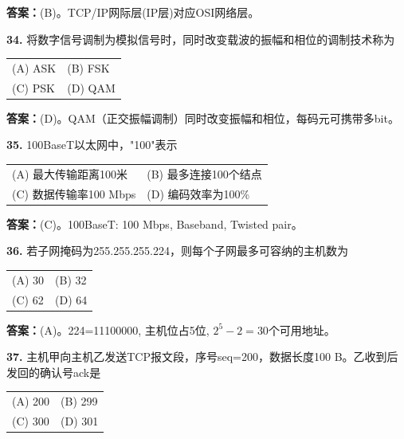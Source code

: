 \ifshowsolutions\par\noindent\textbf{答案：}(B)。TCP/IP网际层(IP层)对应OSI网络层。\else \answerarea \fi

\vspace{6pt}

\noindent\textbf{34.} 将数字信号调制为模拟信号时，同时改变载波的振幅和相位的调制技术称为
\begin{center}
\begin{tabular}{ll}
(A) ASK & (B) FSK \\[6pt]
(C) PSK & (D) QAM
\end{tabular}
\end{center}

\ifshowsolutions\par\noindent\textbf{答案：}(D)。QAM（正交振幅调制）同时改变振幅和相位，每码元可携带多bit。\else \answerarea \fi

\vspace{6pt}

\noindent\textbf{35.} 100BaseT以太网中，"100"表示
\begin{center}
\begin{tabular}{ll}
(A) 最大传输距离100米 & (B) 最多连接100个结点 \\[6pt]
(C) 数据传输率100 Mbps & (D) 编码效率为100\%
\end{tabular}
\end{center}

\ifshowsolutions\par\noindent\textbf{答案：}(C)。100BaseT: 100 Mbps, Baseband, Twisted pair。\else \answerarea \fi

\vspace{6pt}

\noindent\textbf{36.} 若子网掩码为255.255.255.224，则每个子网最多可容纳的主机数为
\begin{center}
\begin{tabular}{ll}
(A) 30 & (B) 32 \\[6pt]
(C) 62 & (D) 64
\end{tabular}
\end{center}

\ifshowsolutions\par\noindent\textbf{答案：}(A)。224=11100000, 主机位占5位, $2^5-2=30$个可用地址。\else \answerarea \fi

\vspace{6pt}

\noindent\textbf{37.} 主机甲向主机乙发送TCP报文段，序号seq=200，数据长度100 B。乙收到后发回的确认号ack是
\begin{center}
\begin{tabular}{ll}
(A) 200 & (B) 299 \\[6pt]
(C) 300 & (D) 301
\end{tabular}
\end{center}

